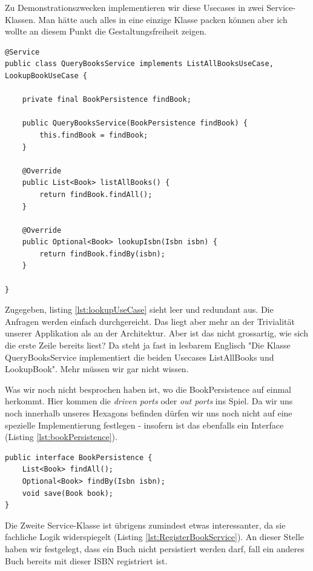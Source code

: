 Zu Demonstrationszwecken implementieren wir diese Usecases in zwei
Service-Klassen. Man hätte auch alles in eine einzige Klasse packen können
aber ich wollte an diesem Punkt die Gestaltungsfreiheit zeigen.

\begin{listing}[H]
\begin{verbatim}
@Service
public class QueryBooksService implements ListAllBooksUseCase, LookupBookUseCase {

    private final BookPersistence findBook;

    public QueryBooksService(BookPersistence findBook) {
        this.findBook = findBook;
    }

    @Override
    public List<Book> listAllBooks() {
        return findBook.findAll();
    }

    @Override
    public Optional<Book> lookupIsbn(Isbn isbn) {
        return findBook.findBy(isbn);
    }
    
}
\end{verbatim}
\caption{Implementierung der ListAll- und Lookup Usecases}
\label{lst:lookupUseCase}
\end{listing}

Zugegeben, listing \ref{lst:lookupUseCase} sieht leer und redundant aus. 
Die Anfragen werden einfach durchgereicht. Das liegt aber mehr an der 
Trivialität unserer Applikation als an der Architektur. Aber ist das nicht
grossartig, wie sich die erste Zeile bereits liest? Da steht ja fast in 
lesbarem Englisch "Die Klasse QueryBooksService implementiert die beiden
Usecases ListAllBooks und LookupBook". Mehr müssen wir gar nicht wissen.

Was wir noch nicht besprochen haben ist, wo die BookPersistence auf einmal
herkommt. Hier kommen die \textit{driven ports} oder \textit{out ports} ins
Spiel. Da wir uns noch innerhalb unseres Hexagons befinden dürfen wir uns 
noch nicht auf eine spezielle Implementierung festlegen - insofern ist das
ebenfalls ein Interface (Listing \ref{lst:bookPersistence}).

\begin{listing}[H]
\begin{verbatim}
public interface BookPersistence {
    List<Book> findAll();
    Optional<Book> findBy(Isbn isbn);
    void save(Book book);
}
\end{verbatim}
\caption{BookPersistence outbound Port}
\label{lst:bookPersistence}
\end{listing}

Die Zweite Service-Klasse ist übrigens zumindest etwas interessanter, da
sie fachliche Logik widerspiegelt (Listing \ref{lst:RegisterBookService}).
An dieser Stelle haben wir festgelegt, dass ein Buch nicht persistiert werden
darf, fall ein anderes Buch bereits mit dieser ISBN registriert ist.

